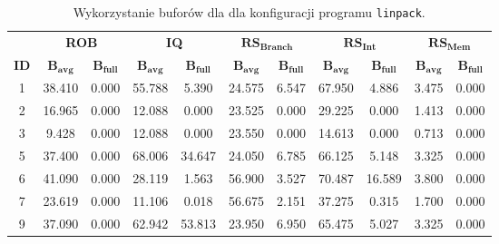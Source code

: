 \begin{table}[]
\centering
\caption{ Wykorzystanie buforów dla dla konfiguracji programu \texttt{linpack}. }
\label{tab:buffers_linpack}
\begin{tabular}{|c|cc|cc|cc|cc|cc|}
\hline& \multicolumn{2}{c|}{\textbf{ROB}} & \multicolumn{2}{c|}{\textbf{IQ}} & \multicolumn{2}{c|}{$\mathbf{RS_{Branch}}$} & \multicolumn{2}{c|}{$\mathbf{RS_{Int}}$} & \multicolumn{2}{c|}{$\mathbf{RS_{Mem}}$} \\ \cline{2-11}
\multirow{-2}{*}{\cellcolor[HTML]{EFEFEF}\textbf{ID}} & $\mathbf{B_{avg}}$ & \cellcolor[HTML]{EFEFEF}$\mathbf{B_{full}}$ & $\mathbf{B_{avg}}$ & \cellcolor[HTML]{EFEFEF}$\mathbf{B_{full}}$ & $\mathbf{B_{avg}}$ & \cellcolor[HTML]{EFEFEF}$\mathbf{B_{full}}$ & $\mathbf{B_{avg}}$ & \cellcolor[HTML]{EFEFEF}$\mathbf{B_{full}}$ & $\mathbf{B_{avg}}$ & \cellcolor[HTML]{EFEFEF}$\mathbf{B_{full}}$ \\ \hline
1 & 38.410 & \cellcolor[HTML]{EFEFEF}0.000 & 55.788 & \cellcolor[HTML]{EFEFEF}5.390 & 24.575 & \cellcolor[HTML]{EFEFEF}6.547 & 67.950 & \cellcolor[HTML]{EFEFEF}4.886 & 3.475 & \cellcolor[HTML]{EFEFEF}0.000 \\ \hline
2 & 16.965 & \cellcolor[HTML]{EFEFEF}0.000 & 12.088 & \cellcolor[HTML]{EFEFEF}0.000 & 23.525 & \cellcolor[HTML]{EFEFEF}0.000 & 29.225 & \cellcolor[HTML]{EFEFEF}0.000 & 1.413 & \cellcolor[HTML]{EFEFEF}0.000 \\ \hline
3 & 9.428 & \cellcolor[HTML]{EFEFEF}0.000 & 12.088 & \cellcolor[HTML]{EFEFEF}0.000 & 23.550 & \cellcolor[HTML]{EFEFEF}0.000 & 14.613 & \cellcolor[HTML]{EFEFEF}0.000 & 0.713 & \cellcolor[HTML]{EFEFEF}0.000 \\ \hline
5 & 37.400 & \cellcolor[HTML]{EFEFEF}0.000 & 68.006 & \cellcolor[HTML]{EFEFEF}34.647 & 24.050 & \cellcolor[HTML]{EFEFEF}6.785 & 66.125 & \cellcolor[HTML]{EFEFEF}5.148 & 3.325 & \cellcolor[HTML]{EFEFEF}0.000 \\ \hline
6 & 41.090 & \cellcolor[HTML]{EFEFEF}0.000 & 28.119 & \cellcolor[HTML]{EFEFEF}1.563 & 56.900 & \cellcolor[HTML]{EFEFEF}3.527 & 70.487 & \cellcolor[HTML]{EFEFEF}16.589 & 3.800 & \cellcolor[HTML]{EFEFEF}0.000 \\ \hline
7 & 23.619 & \cellcolor[HTML]{EFEFEF}0.000 & 11.106 & \cellcolor[HTML]{EFEFEF}0.018 & 56.675 & \cellcolor[HTML]{EFEFEF}2.151 & 37.275 & \cellcolor[HTML]{EFEFEF}0.315 & 1.700 & \cellcolor[HTML]{EFEFEF}0.000 \\ \hline
9 & 37.090 & \cellcolor[HTML]{EFEFEF}0.000 & 62.942 & \cellcolor[HTML]{EFEFEF}53.813 & 23.950 & \cellcolor[HTML]{EFEFEF}6.950 & 65.475 & \cellcolor[HTML]{EFEFEF}5.027 & 3.325 & \cellcolor[HTML]{EFEFEF}0.000 \\ \hline

\end{tabular}
\end{table}
